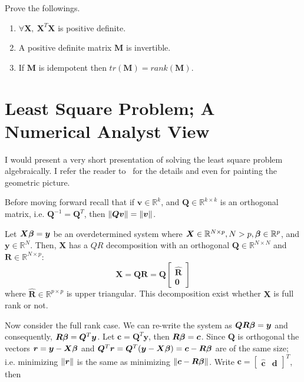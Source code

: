 \begin{exc}
Prove the followings.
\begin{enumerate}[label=(\alph*)]
\item  $\forall \bm X,~ \bm X^T \bm X$ is positive definite.
\item A positive definite matrix $\bm M$ is invertible.
\item If $\bm M$ is idempotent then $tr(\bm M) = rank(\bm M)$.
\end{enumerate}
\end {exc}

\section{Least Square Problem; A Numerical Analyst View}
\label{sec:Least-Square-Problem-A-Numerical-Analyst-View}
I would present a very short presentation of solving the
least square problem algebraically. I refer
the reader to~\citep{watkinsfund} for the details and even
for painting the geometric picture.

Before moving forward recall that if $\bm v \in \mathbb{R}^k$,
and $\bm Q \in \mathbb{R}^{k \times k}$ is an orthogonal matrix, 
i.e. $\bm Q^{-1} = \bm Q^T$, then 
$\lVert{\bm Q \bm v}\rVert = \lVert{\bm v}\rVert$.


Let $\bm X \bm \beta = \bm y$ be an overdetermined system
where  $\bm X \in \mathbb{R}^{N \times p}, N > p, \bm \beta \in  \mathbb{R}^p$, 
and  $\bm y \in \mathbb{R}^N$. Then, $\bm X$ 
has a $QR$ decomposition
with an orthogonal $\bm Q \in \mathbb{R}^{N \times N}$ and 
$\bm R \in \mathbb{R}^{N \times p}$:
\[ \bm X = \bm Q \bm R = \bm Q \begin{bmatrix} \hat{\bm R} \\ \bm 0 \end{bmatrix}\]
where $\hat {\bm R} \in  \mathbb{R}^{p \times p}$ is upper triangular.
This decomposition exist whether $\bm X$ is full rank or not.

Now consider the full rank case.
We can re-write the system as $\bm Q \bm R \bm \beta = \bm y$ 
and consequently, $\bm R \bm \beta = \bm Q^T \bm y$. 
Let $\bm c = \bm Q^T \bm y$, then $\bm R \bm \beta = \bm c$.
Since $\bm Q$ is orthogonal the vectors 
$\bm r = \bm y - \bm X \bm \beta$
and 
$\bm Q^T \bm r = \bm Q^T (\bm y - \bm X \bm \beta) = \bm c - \bm R \bm \beta$
are of the same size; i.e. minimizing $\lVert{\bm r}\rVert$ is the same as
minimizing $\lVert{\bm c - \bm R \bm \beta}\rVert$.
Write $\bm c = \begin{bmatrix} \hat {\bm c} & \bm d \end{bmatrix}^T$,
then

